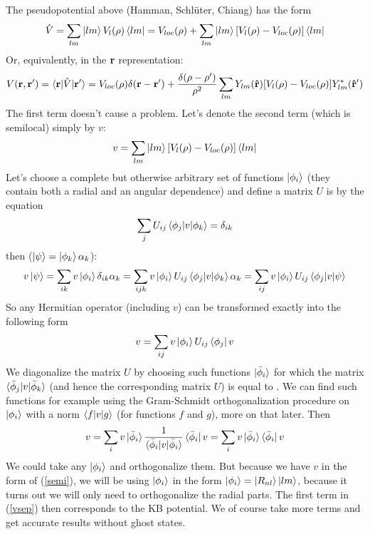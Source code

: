 The pseudopotential above (Hamman, Schlüter, Chiang) has the form 
\begin{equation*}
  \hat V=\sum_{lm} \mathinner{|{lm}\rangle}V_l(\rho)\mathinner{\langle{lm}|} =V_{loc}(\rho)+\sum_{lm} \mathinner{|{lm}\rangle}[V_l(\rho)-V_{loc}(\rho)]\mathinner{\langle{lm}|}
\end{equation*}
Or, equivalently, in the $\bf r$ representation: 
\begin{equation*}
  V({\bf r},{\bf r'})=\mathinner{\langle{{\bf r}|\hat V|{\bf r'}}\rangle}= V_{loc}(\rho)\delta({\bf r}-{\bf r'})+{\delta(\rho-\rho')\over\rho^2} \sum_{lm}Y_{lm}({\bf\hat r})[V_l(\rho)-V_{loc}(\rho)]Y_{lm}^*({\bf\hat r'})
\end{equation*}
The first term doesn't cause a problem. Let's denote the second term (which is semilocal) simply by $v$: 
\begin{equation*}
  v=\sum_{lm} \mathinner{|{lm}\rangle}[V_l(\rho)-V_{loc}(\rho)]\mathinner{\langle{lm}|}
\end{equation*}
Let's choose a complete but otherwise arbitrary set of functions $\mathinner{|{\phi_i}\rangle}$ (they contain both a radial and an angular dependence) and define a matrix $U$ is by the equation 
\begin{equation*}
  \sum_j U_{ij}\mathinner{\langle{\phi_j|v|\phi_k}\rangle}=\delta_{ik}
\end{equation*}
then ($\mathinner{|{\psi}\rangle}=\mathinner{|{\phi_k}\rangle}\alpha_k$): 
\begin{equation*}
  v\mathinner{|{\psi}\rangle} =\sum_{ik}v\mathinner{|{\phi_i}\rangle}\delta_{ik}\alpha_k =\sum_{ijk}v\mathinner{|{\phi_i}\rangle}U_{ij}\mathinner{\langle{\phi_j|v|\phi_k}\rangle}\alpha_k =\sum_{ij}v\mathinner{|{\phi_i}\rangle}U_{ij}\mathinner{\langle{\phi_j|v|\psi}\rangle}
\end{equation*}
So any Hermitian operator (including $v$) can be transformed exactly into the following form 
\begin{equation*}
  v=\sum_{ij}v\mathinner{|{\phi_i}\rangle}U_{ij}\mathinner{\langle{\phi_j}|}v
\end{equation*}
We diagonalize the matrix $U$ by choosing such functions $\mathinner{|{\bar\phi_i}\rangle}$ for which the matrix $\mathinner{\langle{\bar\phi_j|v|\bar\phi_k}\rangle}$ (and hence the corresponding matrix $U$) is equal to \one. We can find such functions for example using the Gram-Schmidt orthogonalization procedure on $\mathinner{|{\phi_i}\rangle}$ with a norm $\mathinner{\langle{f|v|g}\rangle}$ (for functions $f$ and $g$), more on that later. Then 
\begin{equation}
  v =\sum_{i}v\mathinner{|{\bar\phi_i}\rangle}{1\over\mathinner{\langle{\bar\phi_i|v|\bar\phi_i}\rangle}} \mathinner{\langle{\bar\phi_i}|}v =\sum_{i}v\mathinner{|{\bar\phi_i}\rangle}\mathinner{\langle{\bar\phi_i}|}v  \label{vsep}
\end{equation}
We could take any $\mathinner{|{\phi_i}\rangle}$ and orthogonalize them. But because we have $v$ in the form of (\ref{semi}), we will be using $\mathinner{|{\phi_i}\rangle}$ in the form $\mathinner{|{\phi_i}\rangle}=\mathinner{|{R_{nl}}\rangle}\mathinner{|{lm}\rangle}$, because it turns out we will only need to orthogonalize the radial parts. The first term in (\ref{vsep}) then corresponds to the KB potential. We of course take more terms and get accurate results without ghost states.

